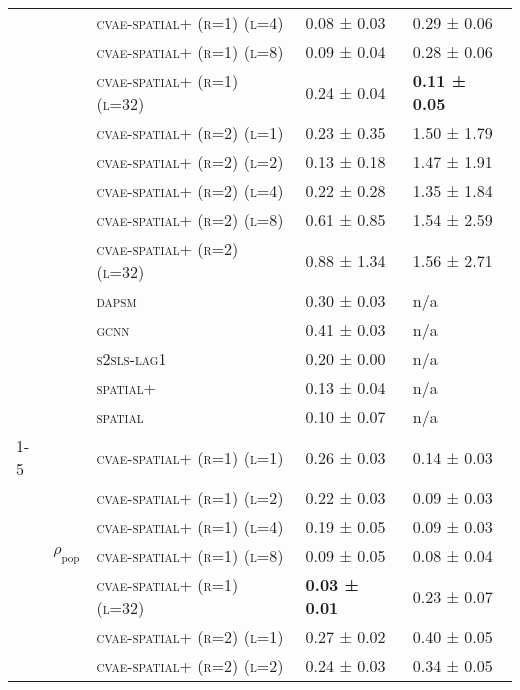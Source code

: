 \documentclass{article}
\begin{document}
\begin{table}[!tbp]
\begin{tabular}{lllll}
 &  & \textsc{cvae-\textsc{spatial+} (r=1) (l=4)} & 0.08 ± {\small 0.03} & 0.29 ± {\small 0.06} \\
 &  & \textsc{cvae-\textsc{spatial+} (r=1) (l=8)} & 0.09 ± {\small 0.04} & 0.28 ± {\small 0.06} \\
 &  & \textsc{cvae-\textsc{spatial+} (r=1) (l=32)} & 0.24 ± {\small 0.04} & \bf 0.11 ± {\small 0.05} \\
 &  & \textsc{cvae-\textsc{spatial+} (r=2) (l=1)} & 0.23 ± {\small 0.35} & 1.50 ± {\small 1.79} \\
 &  & \textsc{cvae-\textsc{spatial+} (r=2) (l=2)} & 0.13 ± {\small 0.18} & 1.47 ± {\small 1.91} \\
 &  & \textsc{cvae-\textsc{spatial+} (r=2) (l=4)} & 0.22 ± {\small 0.28} & 1.35 ± {\small 1.84} \\
 &  & \textsc{cvae-\textsc{spatial+} (r=2) (l=8)} & 0.61 ± {\small 0.85} & 1.54 ± {\small 2.59} \\
 &  & \textsc{cvae-\textsc{spatial+} (r=2) (l=32)} & 0.88 ± {\small 1.34} & 1.56 ± {\small 2.71} \\
 &  & \textsc{dapsm} & 0.30 ± {\small 0.03} & n/a \\
 &  & \textsc{gcnn} & 0.41 ± {\small 0.03} & n/a \\
 &  & \textsc{s2sls-lag1} & 0.20 ± {\small 0.00} & n/a \\
 &  & \textsc{spatial+} & 0.13 ± {\small 0.04} & n/a \\
 &  & \textsc{spatial} & 0.10 ± {\small 0.07} & n/a \\
\cline{1-5} \cline{2-5}
\multirow[t]{30}{*}{$ (LC)\; PM\_{2.5} \;\to\; m \;(r=2) $} & \multirow[t]{15}{*}{$\rho_{\text{pop}}$} & \textsc{cvae-\textsc{spatial+} (r=1) (l=1)} & 0.26 ± {\small 0.03} & 0.14 ± {\small 0.03} \\
 &  & \textsc{cvae-\textsc{spatial+} (r=1) (l=2)} & 0.22 ± {\small 0.03} & 0.09 ± {\small 0.03} \\
 &  & \textsc{cvae-\textsc{spatial+} (r=1) (l=4)} & 0.19 ± {\small 0.05} & 0.09 ± {\small 0.03} \\
 &  & \textsc{cvae-\textsc{spatial+} (r=1) (l=8)} & 0.09 ± {\small 0.05} & 0.08 ± {\small 0.04} \\
 &  & \textsc{cvae-\textsc{spatial+} (r=1) (l=32)} & \bf 0.03 ± {\small 0.01} & 0.23 ± {\small 0.07} \\
 &  & \textsc{cvae-\textsc{spatial+} (r=2) (l=1)} & 0.27 ± {\small 0.02} & 0.40 ± {\small 0.05} \\
 &  & \textsc{cvae-\textsc{spatial+} (r=2) (l=2)} & 0.24 ± {\small 0.03} & 0.34 ± {\small 0.05} \\

\end{tabular}
\end{table}
\end{document}
